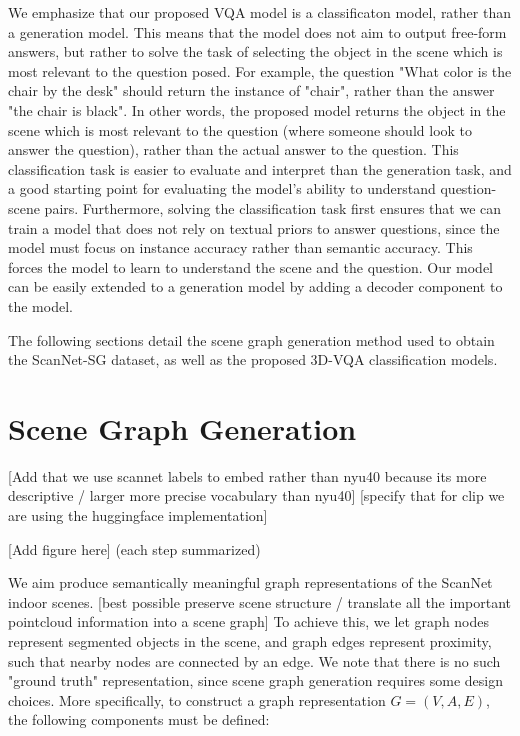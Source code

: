 We emphasize that our proposed VQA model is a classificaton model, rather than a generation model. This means that the model does not aim to output free-form answers, but rather to solve the task of selecting the object in the scene which is most relevant to the question posed. For example, the question "What color is the chair by the desk" should return the instance of "chair", rather than the answer "the chair is black". In other words, the proposed model returns the object in the scene which is most relevant to the question (where someone should look to answer the question), rather than the actual answer to the question. This classification task is easier to evaluate and interpret than the generation task, and a good starting point for evaluating the model's ability to understand question-scene pairs. Furthermore, solving the classification task first ensures that we can train a model that does not rely on textual priors to answer questions, since the model must focus on instance accuracy rather than semantic accuracy. This forces the model to learn to understand the scene and the question. Our model can be easily extended to a generation model by adding a decoder component to the model.

The following sections detail the scene graph generation method used to obtain the ScanNet-SG dataset, as well as the proposed 3D-VQA classification models.






\section{Scene Graph Generation}

[Add that we use scannet labels to embed rather than nyu40 because its more descriptive / larger more precise vocabulary than nyu40]
[specify that for clip we are using the huggingface implementation]

[Add figure here] (each step summarized)

We aim produce semantically meaningful graph representations of the ScanNet indoor scenes. 
[best possible preserve scene structure / translate all the important pointcloud information into a scene graph]
To achieve this, we let graph nodes represent segmented objects in the scene, and graph edges represent proximity, such that nearby nodes are connected by an edge. We note that there is no such "ground truth" representation, since scene graph generation requires some design choices. More specifically, to construct a graph representation $G = (V, A, E)$, the following components must be defined:

